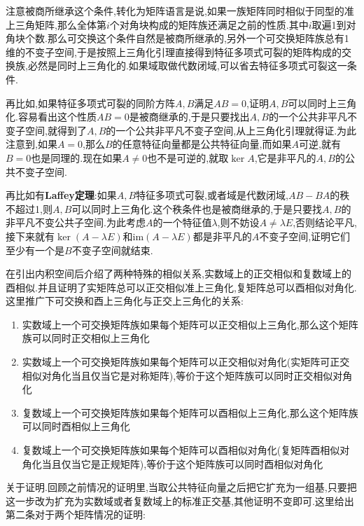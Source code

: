 注意被商所继承这个条件,转化为矩阵语言是说,如果一族矩阵同时相似于同型的准上三角矩阵,那么全体第$i$个对角块构成的矩阵族还满足之前的性质.其中$i$取遍1到对角块个数.那么可交换这个条件自然是被商所继承的,另外一个可交换矩阵族总有1维的不变子空间,于是按照上三角化引理直接得到特征多项式可裂的矩阵构成的交换族,必然是同时上三角化的.如果域取做代数闭域,可以省去特征多项式可裂这一条件.

再比如,如果特征多项式可裂的同阶方阵$A,B$满足$AB=0$,证明$A,B$可以同时上三角化.容易看出这个性质$AB=0$是被商继承的,于是只要找出$A,B$的一个公共非平凡不变子空间,就得到了$A,B$的一个公共非平凡不变子空间,从上三角化引理就得证.为此注意到,如果$A=0$,那么$B$的任意特征向量都是公共特征向量,而如果$A$可逆,就有$B=0$也是同理的.现在如果$A\not=0$也不是可逆的,就取$\ker A$,它是非平凡的$A,B$的公共不变子空间.

再比如有\textbf{Laffey定理}:如果$A,B$特征多项式可裂,或者域是代数闭域,$AB-BA$的秩不超过1,则$A,B$可以同时上三角化.这个秩条件也是被商继承的,于是只要找$A,B$的非平凡不变公共子空间.为此考虑$A$的一个特征值$\lambda$,则不妨设$A\not=\lambda E$,否则结论平凡,接下来就有$\ker(A-\lambda E)$和$\mathrm{im}(A-\lambda E)$都是非平凡的$A$不变子空间,证明它们至少有一个是$B$不变子空间就结束.

在引出内积空间后介绍了两种特殊的相似关系,实数域上的正交相似和复数域上的酉相似.并且证明了实矩阵总可以正交相似准上三角化,复矩阵总可以酉相似对角化.这里推广下可交换和酉上三角化与正交上三角化的关系:
\begin{enumerate}
	\item 实数域上一个可交换矩阵族如果每个矩阵可以正交相似上三角化,那么这个矩阵族可以同时正交相似上三角化
	\item 实数域上一个可交换矩阵族如果每个矩阵可以正交相似对角化(实矩阵可正交相似对角化当且仅当它是对称矩阵),等价于这个矩阵族可以同时正交相似对角化
	\item 复数域上一个可交换矩阵族如果每个矩阵可以酉相似上三角化,那么这个矩阵族可以同时酉相似上三角化
	\item 复数域上一个可交换矩阵族如果每个矩阵可以酉相似对角化(复矩阵酉相似对角化当且仅当它是正规矩阵),等价于这个矩阵族可以同时酉相似对角化
\end{enumerate}

关于证明.回顾之前情况的证明里,当取公共特征向量之后把它扩充为一组基,只要把这一步改为扩充为实数域或者复数域上的标准正交基,其他证明不变即可.这里给出第二条对于两个矩阵情况的证明:


